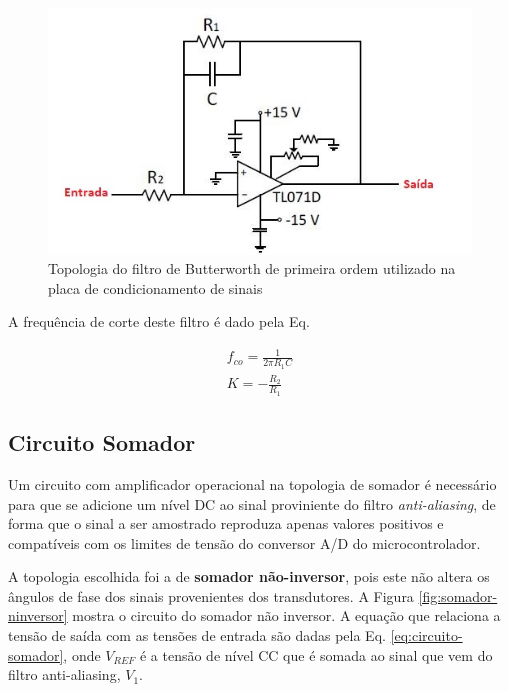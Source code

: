 \begin{figure}[!hbt]
         \begin{center}
         \includegraphics[scale=0.7]{figuras/filtro-butter.JPG}
         \caption{Topologia do filtro de Butterworth de primeira ordem utilizado na placa de condicionamento de sinais}
         \label{fig:filtro-butter}
         \end{center}
 \end{figure}


	A frequência de corte deste filtro é dado pela Eq. 
	
\begin{align}
	f_{co} = \frac{1}{2\pi R_1 C} \label{eq:freq_corte_butter} \\
	K = -\frac{R_2}{R_1}\label{eq:ganho_butter}
\end{align}

\subsection{Circuito Somador}

Um circuito com amplificador operacional na topologia de somador é necessário para que se adicione um nível DC ao sinal proviniente do filtro \textit{anti-aliasing}, de forma que o sinal a ser amostrado reproduza apenas valores positivos e compatíveis com os limites de tensão do conversor A/D do microcontrolador. 

A topologia escolhida foi a de \textbf{somador não-inversor}, pois este não altera os ângulos de fase dos sinais provenientes dos transdutores. A Figura \ref{fig:somador-ninversor} mostra o circuito do somador não inversor. A equação que relaciona a tensão de saída com as tensões de entrada são dadas pela Eq. \ref{eq:circuito-somador}, onde $V_{REF}$ é a tensão de nível CC que é somada ao sinal que vem do filtro anti-aliasing, $V_1$.


